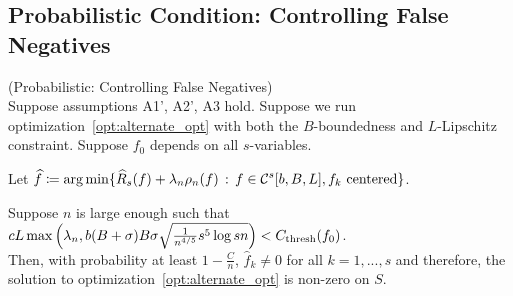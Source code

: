 \documentclass{article}
\begin{document}
\subsection{Probabilistic Condition: Controlling False Negatives}

\begin{theorem} (Probabilistic: Controlling False Negatives)\\
Suppose assumptions A1', A2', A3 hold. Suppose we run optimization~\ref{opt:alternate_opt} with both the $B$-boundedness and $L$-Lipschitz constraint. Suppose $f_0$ depends on all $s$-variables. 

Let $\displaystyle \widehat{f} \coloneqq \arg\min \{ \widehat{R}_s(f) + \lambda_n \rho_n(f) \,:\, f \in \mathcal{C}^s[b,B,L], f_k \textrm{ centered} \}$.

Suppose $n$ is large enough such that $c L \max \left(\lambda_n, b (B+\sigma)B\sigma \sqrt{\frac{1}{n^{4/5}} s^5 \log sn} \right) < C_{\textrm{thresh}}(f_0)$.\\

Then, with probability at least $1-\frac{C}{n}$, $\hat{f}_k \neq 0$ for all $k =1,...,s$ and therefore, the solution to optimization~\ref{opt:alternate_opt} is non-zero on $S$.
\end{theorem}
\end{document}
